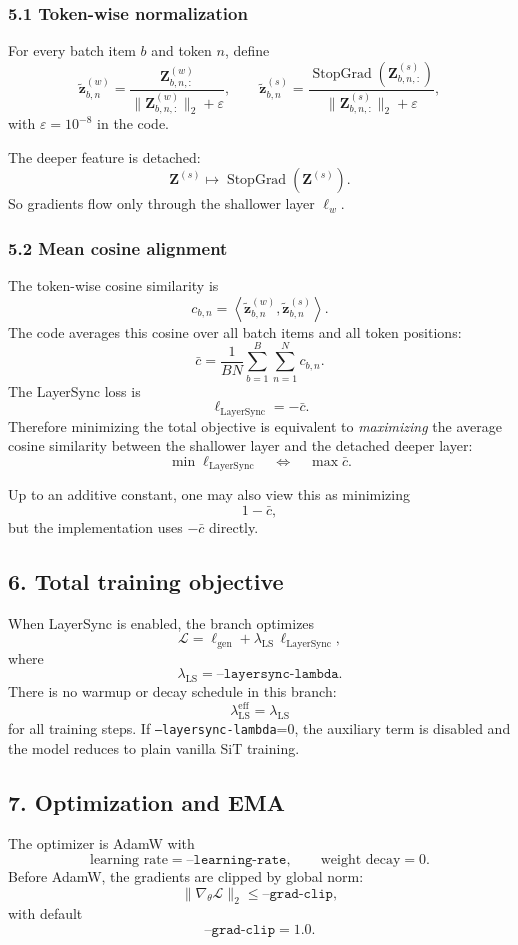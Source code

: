 \documentclass[11pt]{article}
\newcommand{\StopGrad}{\operatorname{StopGrad}}
\begin{document}
\subsubsection*{5.1 Token-wise normalization}
For every batch item $b$ and token $n$, define
\[
  \tilde{\bm{z}}^{(w)}_{b,n}
  =
  \frac{\bm{Z}^{(w)}_{b,n,:}}
       {\|\bm{Z}^{(w)}_{b,n,:}\|_2 + \varepsilon},
  \qquad
  \tilde{\bm{z}}^{(s)}_{b,n}
  =
  \frac{\StopGrad\!\left(\bm{Z}^{(s)}_{b,n,:}\right)}
       {\|\bm{Z}^{(s)}_{b,n,:}\|_2 + \varepsilon},
\]
with $\varepsilon=10^{-8}$ in the code.

The deeper feature is detached:
\[
  \bm{Z}^{(s)} \mapsto \StopGrad\!\left(\bm{Z}^{(s)}\right).
\]
So gradients flow only through the shallower layer $\ell_w$.

\subsubsection*{5.2 Mean cosine alignment}
The token-wise cosine similarity is
\[
  c_{b,n}
  =
  \left\langle
    \tilde{\bm{z}}^{(w)}_{b,n},
    \tilde{\bm{z}}^{(s)}_{b,n}
  \right\rangle.
\]
The code averages this cosine over all batch items and all token positions:
\[
  \bar{c}
  =
  \frac{1}{BN}
  \sum_{b=1}^{B}\sum_{n=1}^{N} c_{b,n}.
\]
The LayerSync loss is
\[
  \ell_{\mathrm{LayerSync}} = -\bar{c}.
\]
Therefore minimizing the total objective is equivalent to \emph{maximizing} the average cosine similarity between the shallower layer and the detached deeper layer:
\[
  \min \ell_{\mathrm{LayerSync}}
  \quad\Longleftrightarrow\quad
  \max \bar{c}.
\]

Up to an additive constant, one may also view this as minimizing
\[
  1-\bar{c},
\]
but the implementation uses $-\bar{c}$ directly.

\subsection*{6. Total training objective}
When LayerSync is enabled, the branch optimizes
\[
  \mathcal{L}
  =
  \ell_{\mathrm{gen}}
  +
  \lambda_{\mathrm{LS}}\,\ell_{\mathrm{LayerSync}},
\]
where
\[
  \lambda_{\mathrm{LS}} = \texttt{--layersync-lambda}.
\]
There is no warmup or decay schedule in this branch:
\[
  \lambda_{\mathrm{LS}}^{\mathrm{eff}} = \lambda_{\mathrm{LS}}
\]
for all training steps. If \texttt{--layersync-lambda}=0, the auxiliary term is disabled and the model reduces to plain vanilla SiT training.

\subsection*{7. Optimization and EMA}
The optimizer is AdamW with
\[
  \text{learning rate} = \texttt{--learning-rate},
  \qquad
  \text{weight decay} = 0.
\]
Before AdamW, the gradients are clipped by global norm:
\[
  \|\nabla_\theta \mathcal{L}\|_2 \le \texttt{--grad-clip},
\]
with default
\[
  \texttt{--grad-clip}=1.0.
\]
\end{document}
